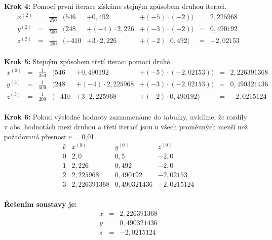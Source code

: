 \textbf{Krok 4:} Pomocí první iterace získáme stejným způsobem druhou iteraci.
\begin{displaymath}
\begin{matrix}
x^{(2)}& =& \frac{1}{250}& (546& +0,492& +(\minus5)\cdot(\minus2)) &= &2,225968\\
y^{(2)}& =& \frac{1}{500}& (248& +(\minus4)\cdot2,226& +(\minus3)\cdot(\minus2)) &= &0,490192\\
z^{(2)}& =& \frac{1}{200}& (\minus410& +3\cdot2,226& +(\minus2)\cdot0,492) &= &\minus2,02153\\
\end{matrix}
\end{displaymath}

\textbf{Krok 5:} Stejným způsobem třetí iteraci pomocí druhé.
\begin{displaymath}
\begin{matrix}
x^{(3)}& =& \frac{1}{250}& (546& +0,490192& +(\minus5)\cdot(\minus2,02153)) &= &2,226391368\\
y^{(3)}& =& \frac{1}{500}& (248& +(\minus4)\cdot2,225968& +(\minus3)\cdot(\minus2,02153)) &= &0,490321436\\
z^{(3)}& =& \frac{1}{200}& (\minus410& +3\cdot2,225968& +(\minus2)\cdot0,490192) &= &\minus2,0215124\\
\end{matrix}
\end{displaymath}

\textbf{Krok 6:} Pokud výsledné hodnoty zaznamenáme do tabulky, uvidíme, že rozdíly v abs. hodnotách mezi druhou a třetí iterací jsou u všech proměnných menší než požadovaná přesnost $\varepsilon$ = 0,01.
\begin{displaymath}
\begin{array}{r|l|l|l}
k & x^{(0)} & y^{(0)} & z^{(0)}\\
\hline
0 & 2,0 & 0,5 & \minus2,0\\
1 & 2,226 & 0,492 & \minus2,0\\
2 & 2,225968 & 0,490192 & \minus2,02153\\
3 & 2,226391368 & 0,490321436 & \minus2,0215124\\
\end{array}
\end{displaymath}

 \textbf{Řešením soustavy je:}
 \begin{displaymath}
 \begin{array}{rcl}
 x & = & 2,226391368 \\
 y & = & 0,490321436 \\
 z & = & \minus2,0215124 \\
\end{array}
\end{displaymath}